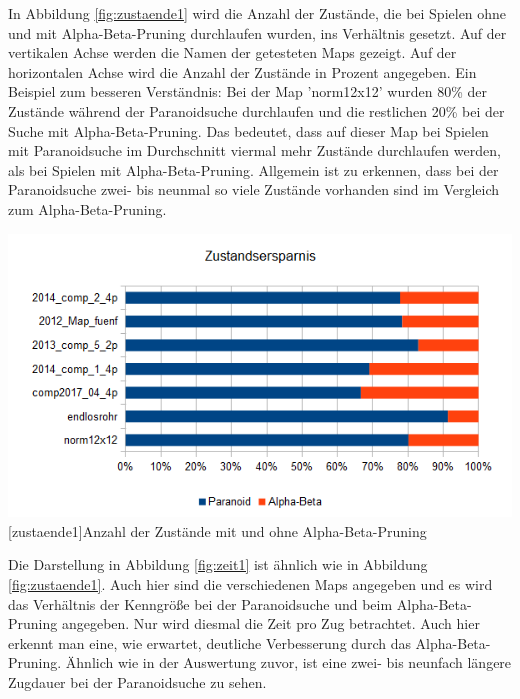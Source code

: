 \documentclass[12pt,a4paper,bibliography=totocnumbered,listof=totocnumbered]{scrartcl}
\begin{document}
    In Abbildung \ref{fig:zustaende1} wird die Anzahl der Zustände, die bei Spielen ohne und mit Alpha-Beta-Pruning durchlaufen wurden, ins Verhältnis gesetzt. Auf der vertikalen Achse werden die Namen der getesteten Maps gezeigt. Auf der horizontalen Achse wird die Anzahl der Zustände in Prozent angegeben. Ein Beispiel zum besseren Verständnis:\newline
    Bei der Map 'norm12x12' wurden 80\% der Zustände während der Paranoidsuche durchlaufen und die restlichen 20\% bei der Suche mit Alpha-Beta-Pruning. Das bedeutet, dass auf dieser Map bei Spielen mit Paranoidsuche im Durchschnitt viermal mehr Zustände durchlaufen werden, als bei Spielen mit Alpha-Beta-Pruning.\newline
    Allgemein ist zu erkennen, dass bei der Paranoidsuche zwei- bis neunmal so viele Zustände vorhanden sind im Vergleich zum Alpha-Beta-Pruning.
    
    \vspace{1em}
    \begin{minipage}{\linewidth}
    	\centering
    	\includegraphics[width=0.9\linewidth]{pics/Kapitel_4/ZustandParaAlpha.png}
    	[zustaende1]{Anzahl der Zustände mit und ohne Alpha-Beta-Pruning}
    	\label{fig:zustaende1}
    \end{minipage}
    
    Die Darstellung in Abbildung \ref{fig:zeit1} ist ähnlich wie in Abbildung \ref{fig:zustaende1}. Auch hier sind die verschiedenen Maps angegeben und es wird das Verhältnis der Kenngröße bei der Paranoidsuche und beim Alpha-Beta-Pruning angegeben. Nur wird diesmal die Zeit pro Zug betrachtet.
    Auch hier erkennt man eine, wie erwartet, deutliche Verbesserung durch das Alpha-Beta-Pruning. Ähnlich wie in der Auswertung zuvor, ist eine zwei- bis neunfach längere Zugdauer bei der Paranoidsuche zu sehen.
    
\end{document}
